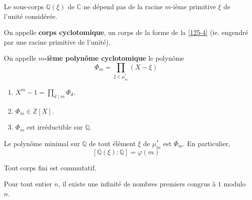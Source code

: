 	\begin{proposition}
		\label{125-4}
		Le sous-corps $\mathbb{Q}(\xi)$ de $\mathbb{C}$ ne dépend pas de la racine $m$-ième primitive $\xi$ de l'unité considérée.
	\end{proposition}

	\begin{definition}
		On appelle \textbf{corps cyclotomique}, un corps de la forme de la \cref{125-4} (ie. engendré par une racine primitive de l'unité).
	\end{definition}

	\begin{definition}
		On appelle \textbf{$m$-ième polynôme cyclotomique} le polynôme
		\[ \Phi_m = \prod_{\xi \in \mu_m^*} (X - \xi) \]
	\end{definition}

	\begin{theorem}
		\begin{enumerate}[label=(\roman*)]
			\item $X^m - 1 = \prod_{d \mid m} \Phi_d$.
			\item $\Phi_m \in \mathbb{Z}[X]$.
			\item $\Phi_m$ est irréductible sur $\mathbb{Q}$.
		\end{enumerate}
	\end{theorem}

	\begin{corollary}
		Le polynôme minimal sur $\mathbb{Q}$ de tout élément $\xi$ de $\mu_m^*$ est $\Phi_m$. En particulier,
		\[ [\mathbb{Q}(\xi):\mathbb{Q}]=\varphi(m) \]
	\end{corollary}

	\begin{application}
		Tout corps fini est commutatif.
	\end{application}


	\begin{application}
		Pour tout entier $n$, il existe une infinité de nombres premiers congrus à $1$ modulo $n$.
	\end{application}

